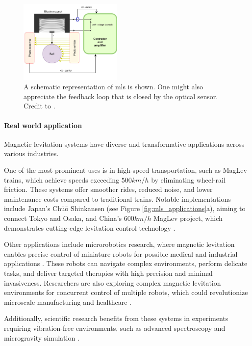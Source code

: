 \begin{figure}[H]
    \centering
    \includegraphics[width=0.45\textwidth]{./img/magLev_general_scheme.png}
    \caption{A schematic representation of \acrshort{mls} is shown. One might also appreciate the feedback loop that is closed by the optical sensor. Credit to \cite{Jastrzębski2024}.}
    \label{fig:MLS_general_scheme}
\end{figure}

\paragraph{Real world application}

Magnetic levitation systems have diverse and transformative applications across various industries.

One of the most prominent uses is in high-speed transportation, such as MagLev trains, which achieve speeds exceeding $500 km/h$ by eliminating wheel-rail friction.
These systems offer smoother rides, reduced noise, and lower maintenance costs compared to traditional trains.
Notable implementations include Japan's Chūō Shinkansen (see Figure \ref{fig:mls_applications}a), aiming to connect Tokyo and Osaka, and China's $600 km/h$ MagLev project, which demonstrates cutting-edge levitation control technology \cite{WikiSCMaglev}.

Other applications include microrobotics research, where magnetic levitation enables precise control of miniature robots for possible medical and industrial applications \cite{microrobotsControl}.
These robots can navigate complex environments, perform delicate tasks, and deliver targeted therapies with high precision and minimal invasiveness.
Researchers are also exploring complex magnetic levitation environments for concurrent control of multiple robots, which could revolutionize microscale manufacturing and healthcare \cite{Independent3DControl}.

Additionally, scientific research benefits from these systems in experiments requiring vibration-free environments, such as advanced spectroscopy \cite{spectroscopy} and microgravity simulation \cite{microgravity}.



